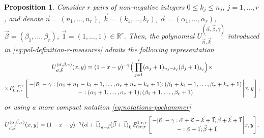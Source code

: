 \documentclass[11pt,reqno]{amsart}
\newcommand{\KF}[5]{F^{#1}_{#2}\left[{#3\atop #4}\Bigg\vert #5\right]}
\newtheorem{proposition}[theorem]{Proposition}
\theoremstyle{definition}
\begin{document}
\begin{proposition}\label{prop:hypergeometric-expression} Consider $r$ pairs of non-negative integers $0\leq k_j \leq n_j$, $j=1,\dots,r$, and denote $\vec n =(n_1,\dots,n_r)$, $\vec k=(k_1,\dots,k_r)$, $\vec\alpha=(\alpha_1,\dots,\alpha_r)$, $\vec\beta=(\beta_1,\dots,\beta_r)$, $\vec 1 =(1,\dots,1)\in\mathbb R^r$. Then, the polynomial $U_{\vec n,\vec k}^{(\vec\alpha,\vec\beta,\gamma)}$ introduced in \eqref{eq:pol-definition-r-measures} admits the following representation
\begin{multline}
    U_{\vec n,\vec k}^{(\vec\alpha,\vec\beta,\gamma)}(x,y)=(1-x-y)^{-\gamma}\Big(\prod_{j=1}^r (\alpha_j+1)_{n_j-k_j}(\beta_j+1)_{k_j}\Big)\times\\\times\KF{1:r;r}{0:r;r}{-|\vec n|-\gamma:(\alpha_1+n_1-k_1+1,\dots,\alpha_r+n_r-k_r+1);(\beta_1+k_1+1,\dots,\beta_r+k_r+1)}{-:(\alpha_1+1,\dots,\alpha_r+1);(\beta_1+1,\dots,\beta_r+1)}{x, y},
\end{multline}
or using a more compact notation \eqref{eq:notations-pochammer}
\begin{equation}\label{eq:hypergeometric-expansion-r-measures}
        U_{\vec n,\vec k}^{(\vec\alpha,\vec\beta,\gamma)}(x,y)=(1-x-y)^{-\gamma}(\vec \alpha+\vec 1)_{\vec n-\vec k}(\vec \beta+\vec 1)_{\vec k}\, \KF{1:r;r}{0:r;r}{-|\vec n|-\gamma:\vec\alpha+\vec n-\vec k+\vec 1;\vec \beta+\vec k+\vec 1}{-:\vec\alpha+\vec 1;\vec\beta+\vec 1}{x, y}.
\end{equation}
\end{proposition}
\end{document}
